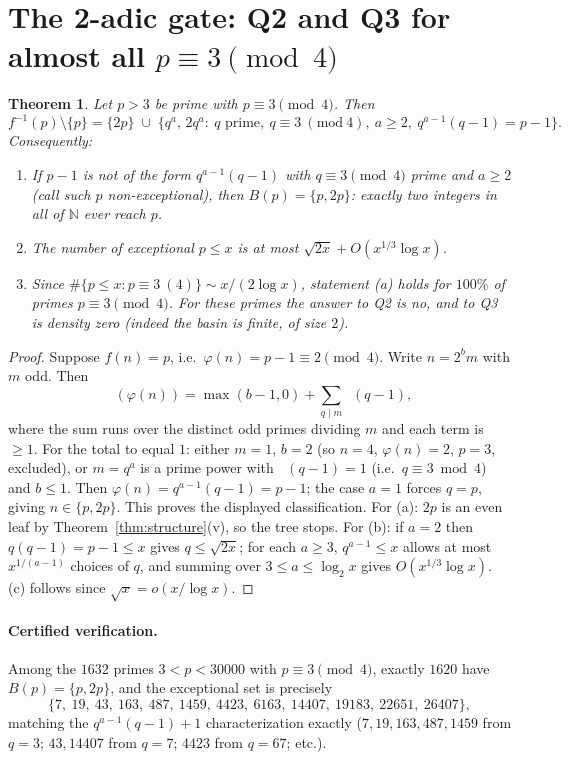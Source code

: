 \documentclass[11pt,a4paper]{article}
\newtheorem{theorem}{Theorem}
\theoremstyle{remark}
\newcommand{\N}{\mathbb{N}}
\DeclareMathOperator{\vv}{v_2}
\begin{document}
\section{The 2-adic gate: Q2 and Q3 for almost all $p\equiv 3\pmod 4$}

\begin{theorem}\label{thm:gate}
Let $p>3$ be prime with $p\equiv 3\pmod 4$. Then
\[
f^{-1}(p)\setminus\{p\}=\{2p\}\;\cup\;\bigl\{q^a,\,2q^a:\ q\text{ prime},\ q\equiv 3\ (\mathrm{mod}\ 4),\ a\ge 2,\ q^{a-1}(q-1)=p-1\bigr\}.
\]
Consequently:
\begin{enumerate}
\item[(a)] If $p-1$ is \emph{not} of the form $q^{a-1}(q-1)$ with $q\equiv 3\pmod 4$ prime and $a\ge 2$ (call such $p$ non-exceptional), then $B(p)=\{p,2p\}$: exactly two integers in all of $\N$ ever reach $p$.
\item[(b)] The number of exceptional $p\le x$ is at most $\sqrt{2x}+O(x^{1/3}\log x)$.
\item[(c)] Since $\#\{p\le x:p\equiv 3\ (4)\}\sim x/(2\log x)$, statement (a) holds for $100\%$ of primes $p\equiv 3\pmod 4$. For these primes the answer to Q2 is no, and to Q3 is density zero (indeed the basin is finite, of size $2$).
\end{enumerate}
\end{theorem}

\begin{proof}
Suppose $f(n)=p$, i.e.\ $\varphi(n)=p-1\equiv 2\pmod 4$. Write $n=2^b m$ with $m$ odd. Then
\[
\vv(\varphi(n))=\max(b-1,0)+\sum_{q\mid m}\vv(q-1),
\]
where the sum runs over the distinct odd primes dividing $m$ and each term is $\ge 1$. For the total to equal $1$: either $m=1$, $b=2$ (so $n=4$, $\varphi(n)=2$, $p=3$, excluded), or $m=q^a$ is a prime power with $\vv(q-1)=1$ (i.e.\ $q\equiv 3\bmod 4$) and $b\le 1$. Then $\varphi(n)=q^{a-1}(q-1)=p-1$; the case $a=1$ forces $q=p$, giving $n\in\{p,2p\}$. This proves the displayed classification. For (a): $2p$ is an even leaf by Theorem~\ref{thm:structure}(v), so the tree stops. For (b): if $a=2$ then $q(q-1)=p-1\le x$ gives $q\le\sqrt{2x}$; for each $a\ge 3$, $q^{a-1}\le x$ allows at most $x^{1/(a-1)}$ choices of $q$, and summing over $3\le a\le\log_2 x$ gives $O(x^{1/3}\log x)$. (c) follows since $\sqrt x=o(x/\log x)$.
\end{proof}

\paragraph{Certified verification.} Among the $1632$ primes $3<p<30000$ with $p\equiv 3\pmod 4$, exactly $1620$ have $B(p)=\{p,2p\}$, and the exceptional set is precisely
\[
\{7,\ 19,\ 43,\ 163,\ 487,\ 1459,\ 4423,\ 6163,\ 14407,\ 19183,\ 22651,\ 26407\},
\]
matching the $q^{a-1}(q-1)+1$ characterization exactly ($7,19,163,487,1459$ from $q=3$; $43,14407$ from $q=7$; $4423$ from $q=67$; etc.).
\end{document}
